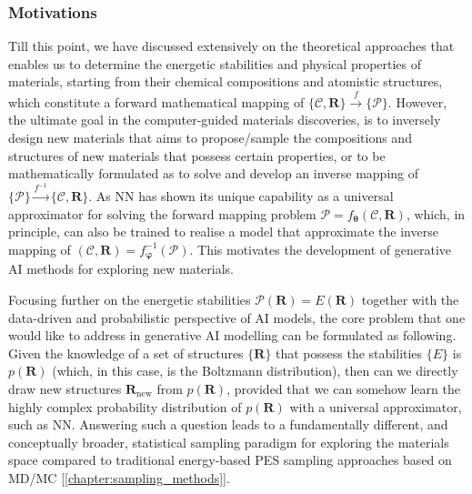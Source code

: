 \subsubsection{Motivations}

Till this point, we have discussed extensively on the theoretical approaches that enables us to determine the energetic stabilities and physical properties of materials, starting from their chemical compositions and atomistic structures, which constitute a forward mathematical mapping of $\{\mathcal{C},\bm{R}\}\xrightarrow{f}\{\mathcal{P}\}$. However, the ultimate goal in the computer-guided materials discoveries, is to inversely design new materials\cite{zunger2018inverse} that aims to propose/sample the compositions and structures of new materials that possess certain properties, or to be  mathematically formulated as to solve and develop an inverse mapping of   $\{\mathcal{P}\}\xrightarrow{f^{-1}}\{\mathcal{C},\bm{R}\}$. As NN has shown its unique capability as a universal approximator for solving the forward mapping problem $\mathcal{P}=f_{\boldsymbol{\theta}}(\mathcal{C},\bm{R})$, which, in principle, can also be trained to realise a model that approximate the inverse mapping of $(\mathcal{C},\bm{R})=f^{-1}_{\boldsymbol{\varphi}}(\mathcal{P})$. This motivates the development of generative AI methods for exploring new materials. 

Focusing further on the energetic stabilities $\mathcal{P}(\bm{R})=E(\bm{R})$ together with the data-driven and probabilistic perspective of AI models, the core problem that one would like to address in generative AI modelling can be formulated as following. Given the knowledge of a set of structures $\{\bm{R}\}$ that possess the stabilities $\{E\}$ is $p(\bm{R})$ (which, in this case, is the Boltzmann distribution), then can we directly draw new structures $\bm{R}_{\mathrm{new}}$ from $p(\bm{R})$, provided that we can somehow learn the highly complex probability distribution of $p(\bm{R})$ with a universal approximator, such as NN. Answering such a question leads to a fundamentally different, and conceptually broader, statistical sampling paradigm for exploring the materials space compared to traditional energy-based PES sampling approaches based on MD/MC [\cref{chapter:sampling_methods}]. 

